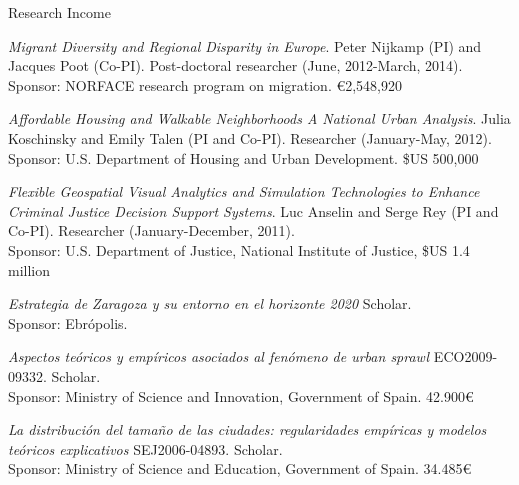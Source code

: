 \documentclass[12pt,2up]{article}
\begin{document}
\begin{cv}{}
\begin{cvlist}{Research Income}

    \item[\textbf{Projects (as researcher)}]
\item[2009-2013] \emph{Migrant Diversity and Regional Disparity in Europe}. Peter
    Nijkamp (PI) and Jacques Poot (Co-PI).
    Post-doctoral researcher (June, 2012-March, 2014). \\ Sponsor: NORFACE research program on
    migration. \euro2,548,920

\item[2011-2013] \emph{Affordable Housing and Walkable Neighborhoods A
    National Urban Analysis}. Julia Koschinsky and Emily Talen (PI and Co-PI).
    Researcher (January-May, 2012). \\ Sponsor: U.S. Department of Housing and Urban Development. \$US 500,000

\item[2011-2013] \emph{Flexible Geospatial Visual Analytics and Simulation
    Technologies to Enhance Criminal Justice Decision Support Systems}. Luc
    Anselin and Serge Rey (PI and Co-PI).
    Researcher (January-December, 2011). \\ Sponsor: U.S. Department of Justice, National Institute of
    Justice, \$US 1.4 million

\item[2010] \emph{Estrategia de Zaragoza y su entorno en el horizonte 2020}
    Scholar. \\ Sponsor: Ebr\'{o}polis.

\item[2009-2012] \emph{Aspectos te\'{o}ricos y emp\'{i}ricos asociados al
    fen\'{o}meno de
    urban sprawl} ECO2009-09332. Scholar. \\ Sponsor: Ministry of Science and Innovation,
    Government of Spain. 42.900\euro

  \item[2007-2009] \emph{La distribuci\'{o}n del tama\~{n}o de las ciudades:
     regularidades emp\'{i}ricas y modelos te\'{o}ricos explicativos}
     SEJ2006-04893. Scholar. \\ Sponsor: Ministry of Science and Education, Government of Spain.
    34.485\euro




\end{cvlist}
\end{cv}
\end{document}

